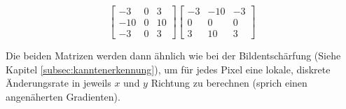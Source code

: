 \begin{equation}
	\begin{bmatrix}
  	-3     & 0      & 3 \\
	-10   & 0      & 10 \\
	-3     & 0      & 3
	\end{bmatrix}
	\begin{bmatrix}
  	-3     & -10   & -3\\
	0      & 0      & 0\\
	3      & 10    & 3
	\end{bmatrix}	
	\label{eq:scharrfilter}
\end{equation}
\cite{computervision_szeliski:2}

Die beiden Matrizen werden dann ähnlich wie bei der Bildentschärfung (Siehe Kapitel \ref{subsec:kanntenerkennung}), um für jedes Pixel eine lokale, diskrete Änderungsrate in jeweils $x$ und $y$ Richtung zu berechnen (sprich einen angenäherten  Gradienten).



